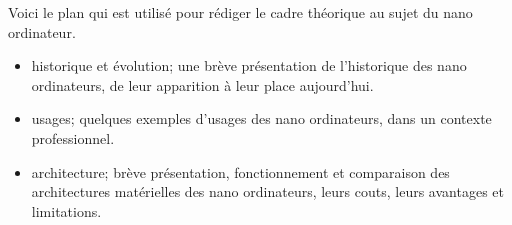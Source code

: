 ﻿{\color{red}
\par Voici le plan qui est utilisé pour rédiger le cadre théorique au sujet du nano ordinateur.
\begin{itemize}
   \item historique et évolution; une brève présentation de l'historique des nano ordinateurs, de leur apparition à leur place aujourd'hui.
   \par 
   \item usages; quelques exemples d'usages des nano ordinateurs, dans un contexte professionnel.
   \par 
   \item architecture; brève présentation, fonctionnement et comparaison des architectures matérielles des nano ordinateurs, leurs couts, leurs avantages et limitations.
   \par 
\end{itemize}
}